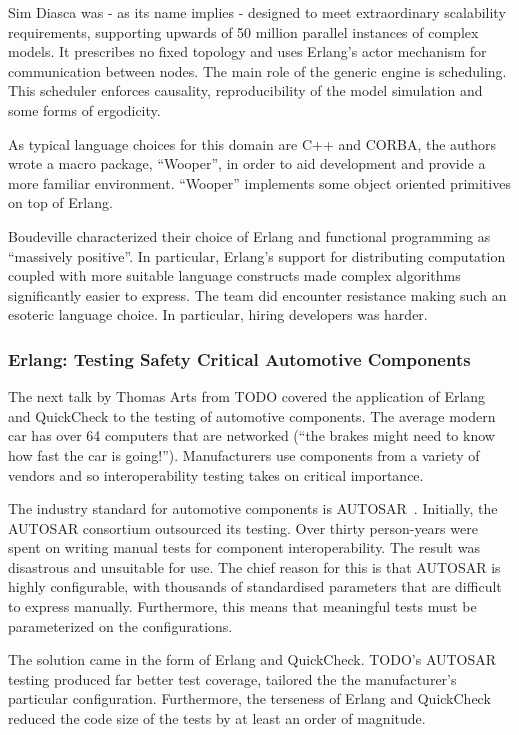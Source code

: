 \documentclass{jfp1}
\begin{document}
Sim Diasca was - as its name implies - designed to meet extraordinary
scalability requirements, supporting upwards of 50 million parallel
instances of complex models.  It prescribes no fixed topology and uses
Erlang's actor mechanism for communication between nodes.  The main
role of the generic engine is scheduling.  This scheduler enforces
causality, reproducibility of the model simulation and some forms of
ergodicity.

As typical language choices for this domain are C++ and CORBA, the
authors wrote a macro package, ``Wooper'', in order to aid development
and provide a more familiar environment.  ``Wooper'' implements some
object oriented primitives on top of Erlang.

Boudeville characterized their choice of Erlang and functional
programming as ``massively positive''.  In particular, Erlang's
support for distributing computation coupled with more suitable
language constructs made complex algorithms significantly easier to
express.  The team did encounter resistance making such an esoteric
language choice.  In particular, hiring developers was harder.

\subsubsection{Erlang: Testing Safety Critical Automotive Components}

The next talk by Thomas Arts from TODO covered the application of
Erlang and QuickCheck to the testing of automotive components.  The
average modern car has over 64 computers that are networked (``the
brakes might need to know how fast the car is going!'').
Manufacturers use components from a variety of vendors and so
interoperability testing takes on critical importance.

The industry standard for automotive components is AUTOSAR~\cite{x}.
Initially, the AUTOSAR consortium outsourced its testing.  Over thirty
person-years were spent on writing manual tests for component
interoperability.  The result was disastrous and unsuitable for use.
The chief reason for this is that AUTOSAR is highly configurable, with
thousands of standardised parameters that are difficult to express
manually.  Furthermore, this means that meaningful tests must be
parameterized on the configurations.

The solution came in the form of Erlang and QuickCheck.  TODO's
AUTOSAR testing produced far better test coverage, tailored the the
manufacturer's particular configuration.  Furthermore, the terseness
of Erlang and QuickCheck reduced the code size of the tests by at
least an order of magnitude.
\end{document}
